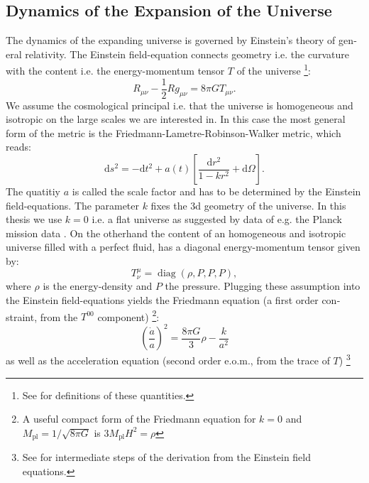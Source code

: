 \documentclass[master,       %
               twoside,        %
               BCOR10mm,       %
               english,ngerman, %
               ]{GAUBM}
\begin{document}
\begin{otherlanguage}{english}
\subsection{Dynamics of the Expansion of the Universe}
\label{sec:dynamics_of_the_examsion_of_the_universe}
The dynamics of the expanding universe is governed by Einstein's theory of general relativity. The Einstein field-equation connects geometry i.e. the curvature with the content i.e. the energy-momentum tensor $T$ of the universe \footnote{
See \cite{carroll_spacetime_and_geometry_2019} for definitions of these quantities.
}:
\begin{equation}
	R_{\mu \nu} - \frac{1}{2} R g_{\mu \nu} = 8 \pi G T_{\mu \nu}.
\end{equation}
We assume the cosmological principal i.e. that the universe is homogeneous and isotropic on the large scales we are interested in. In this case the most general form of the metric is the Friedmann-Lametre-Robinson-Walker metric, which reads:
\begin{equation}
	\mathrm{d} s^2 = - \mathrm{d} t^2 + a(t) \left[ \frac{\mathrm{d} r^2}{1 - kr^2} + \mathrm{d} \Omega \right].
\end{equation}
The quatitiy $a$ is called the scale factor and has to be determined by the Einstein field-equations.
The parameter $k$ fixes the 3d geometry of the universe. In this thesis we use $k = 0$ i.e. a flat universe as suggested by data of e.g. the Planck mission data \cite{planck2018}.
On the otherhand the content of an homogeneous and isotropic universe filled with a perfect fluid, has a diagonal energy-momentum tensor given by:
\begin{equation}
	T_\nu^\mu = \operatorname{diag}(\rho, P, P, P),
\end{equation}
where $\rho$ is the energy-density and $P$ the pressure.
Plugging these assumption into the Einstein field-equations yields the Friedmann equation (a first order constraint, from the $T^{00}$ component) \footnote{
A useful compact form of the Friedmann equation for $k = 0$ and $M_\mathrm{pl} = 1 / \sqrt{8 \pi G}$ is $3 M_\mathrm{pl} H^2 = \rho$
}:
\begin{equation}
	\label{eq:friedmann_equation}
	\boxed{
	\left( \frac{\dot{a}}{a} \right)^2 = \frac{8 \pi G}{3} \rho - \frac{k}{a^2}
	}
\end{equation}
as well as the acceleration equation (second order e.o.m., from the trace of $T$) \footnote{
See \cite[sec. 2.1, 3.1]{the_early_universe_kolb_and_turner} for intermediate steps of the derivation from the Einstein field equations.
}
\end{otherlanguage}
\end{document}

